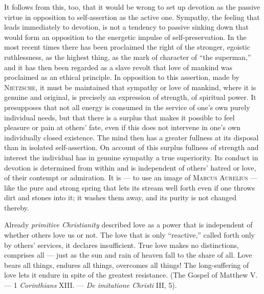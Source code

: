 \documentclass[12pt,a4paper,openany]{book}
\newcommand{\opage}[1]{\marginnote{\footnotesize\textit{[#1]}}}
\begin{document}
It follows from this, too, that it would be wrong to set up devotion as the passive virtue in opposition to
self-assertion as the active one. Sympathy, the feeling that leads immediately to devotion, is not a tendency to
passive sinking down that would form an opposition to the energetic impulse of self-preservation. In the most
recent times there has been proclaimed
\opage{186}the right of the stronger, egoistic ruthlessness, as the highest thing, as the mark of character of ``the
superman,'' and it has then been regarded as a slave revolt that love of mankind was proclaimed as an ethical
principle. In opposition to this assertion, made by \textsc{Nietzsche}, it must be maintained that sympathy or
love of mankind, where it is genuine and original, is precisely an expression of strength, of spiritual power. It
presupposes that not all energy is consumed in the service of one's own purely individual needs, but that there
is a surplus that makes it possible to feel pleasure or pain at others' fate, even if this does not intervene in
one's own individually closed existence. The mind then has a greater fullness at its disposal than in isolated
self-assertion. On account of this surplus fullness of strength and interest the individual has in genuine
sympathy a true superiority. Its conduct in devotion is determined from within and is independent of others'
hatred or love, of their contempt or admiration. It is --- to use an image of \textsc{Marcus Aurelius} --- like
the pure and strong spring that lets its stream well forth even if one throws dirt and stones into it; it washes
them away, and its purity is not changed thereby.

Already \textit{primitive Christianity} described love as a power that is independent of whether others love us
or not. The love that is only ``reactive,'' called forth only by others' services, it declares insufficient. True
love makes no distinctions, comprises all --- just as the sun and rain of heaven fall to the share of all. Love
bears all things, endures all things, overcomes all things! The long-suffering of love lets it endure in spite of
the greatest resistance. (The Gospel of Matthew V. --- 1 \textit{Corinthians} XIII. --- \textit{De imitatione
Christi} III, 5).
\end{document}
